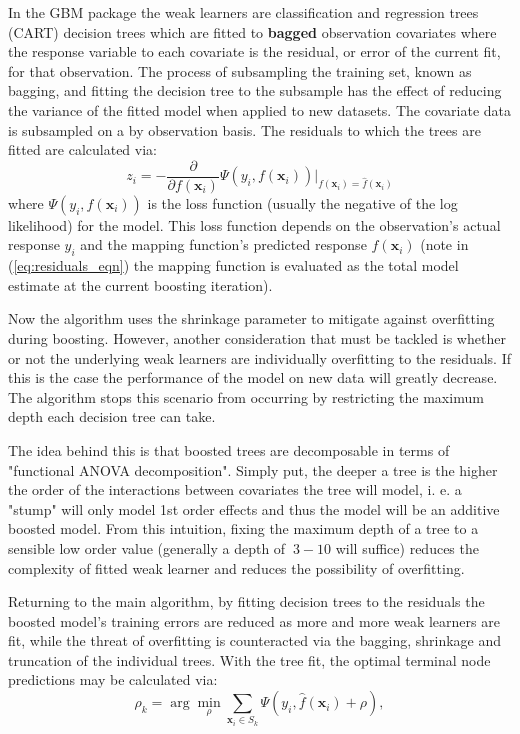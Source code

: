 \documentclass{article}
\begin{document}
In the GBM package the weak learners are classification and regression trees (CART) decision trees which are fitted to \textbf{bagged} observation covariates where the response variable to each covariate is the residual, or error of the current fit, for that observation. The process of subsampling the training set, known as bagging, and fitting the decision tree to the subsample has the effect of reducing the variance of the fitted model when applied to new datasets.  The covariate data is subsampled on a by observation basis. The residuals to which the trees are fitted are calculated via:
\begin{equation}
\label{eq:residuals_eqn}
z_{i} = -\frac{\partial}{\partial f(\mathbf{x}_i)}\Psi(y_{i},f(\mathbf{x}_i))|_{f(\mathbf{x}_i) = \hat{f}(\mathbf{x}_i)}
\end{equation}
where $\Psi(y_i, f(\mathbf{x}_i))$ is the loss function (usually the negative of the log likelihood) for the model. This loss function depends on the observation's actual response $y_i$ and the mapping function's predicted response $f(\mathbf{x}_i)$ (note in (\ref{eq:residuals_eqn}) the mapping function is evaluated as the total model estimate at the current boosting iteration).

Now the algorithm uses the shrinkage parameter to mitigate against overfitting during boosting. However, another consideration that must be tackled is whether or not the underlying weak learners are individually overfitting to the residuals.  If this is the case the performance of the model on new data will greatly decrease.  The algorithm stops this scenario from occurring by restricting the maximum depth each decision tree can take. 

The idea behind this is that boosted trees are decomposable in terms of "functional ANOVA decomposition". Simply put, the deeper a tree is the higher the order of the interactions between covariates the tree will model, i. e. a "stump" will only model 1st order effects and thus the model will be an additive boosted model.  From this intuition, fixing the maximum depth of a tree to a sensible low order value (generally a depth of $~3-10$ will suffice) reduces the complexity of fitted weak learner and reduces the possibility of overfitting.

Returning to the main algorithm, by fitting decision trees to the residuals the boosted model's training errors are reduced as more and more weak learners are fit, while the threat of overfitting is counteracted via the bagging, shrinkage and truncation of the individual trees. With the tree fit, the optimal terminal node predictions may be calculated via:
\begin{equation}
\label{eq:node_pred_eqn}
\rho_k = \arg \min_{\rho} \sum_{\mathbf{x}_i \in S_k} \Psi(y_i, \hat{f}(\mathbf{x}_i) +\rho),  
\end{equation}
\end{document}
